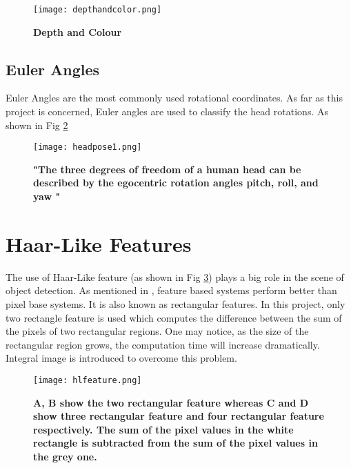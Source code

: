 \begin{figure}
	\centering
	\texttt{[image: depthandcolor.png]}
	\caption[depth and colour images]{\label{fig:depth}}  \textbf{Depth and Colour} 
\end{figure}

\subsection{Euler Angles}
\label{sec:eulerangles}
Euler Angles are the most commonly used rotational coordinates. As far as this project is concerned, Euler angles are used to classify the head rotations. As shown in Fig \ref{fig:eulerangles}

\begin{figure}
	\centering
	\texttt{[image: headpose1.png]}
	\caption[Euler Angles]{\label{fig:eulerangles}}  \textbf{"The three degrees of freedom of a human head can be described by the egocentric rotation angles pitch, roll, and yaw "\cite{HPS}} 
\end{figure}




\newpage
\thispagestyle{plain}
\mbox{}

\section{Haar-Like Features}
\label{sec:HLfeatures}
The use of Haar-Like feature (as shown in Fig \ref{fig:hlfeature}) plays a big role in the scene of object detection. As mentioned in \cite{facedetect}, feature based systems perform better than pixel base systems. It is also known as rectangular features. In this project, only two rectangle feature is used which computes the difference between the sum of the pixels of two rectangular regions. One may notice, as the size of the rectangular region grows, the computation time will increase dramatically. Integral image is introduced to overcome this problem. \cite{facedetect}

\begin{figure}
	\centering
	\texttt{[image: hlfeature.png]}
	\caption[Haar like Feature]{\label{fig:hlfeature}}  \textbf{A, B show the two rectangular feature whereas C and D show three rectangular feature and four rectangular feature respectively. The sum of the pixel values in the white rectangle is subtracted from the sum of the pixel values in the grey one. } \cite{facedetect}
\end{figure}

